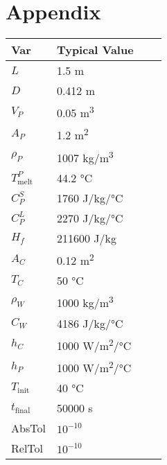 \documentclass[12pt]{article}
\begin{document}
\section{Appendix}
\begin{table}[!h]
\caption{Standard Input Variables} \label{TblInputVar}
\renewcommand{\arraystretch}{1.2}
\noindent \begin{longtable}{l l l c} 
  \toprule
  \textbf{Var} & \textbf{Typical Value}\\
  \midrule 
  $L$	& 1.5 \si[per-mode=symbol]	{\metre}
  \\
  $D$	& 0.412 \si[per-mode=symbol] {\metre}	
  \\
  $V_P$ & 0.05 \si[per-mode=symbol] {\cubic\metre}	
  \\
  $A_P$ & 1.2 \si[per-mode=symbol] {\square\metre}	
  \\
  $\rho_P$ & 1007 \si[per-mode=symbol] {\kilogram\per\cubic\metre}
  \\
  $T_\text{melt}^{P}$ &	44.2 \si[per-mode=symbol] {\celsius} 
  \\
  $C_P^S$ & 1760 \si[per-mode=symbol] {\joule\per\kilo\gram\per\celsius}
  \\
  $C_P^L$ & 2270 \si[per-mode=symbol] {\joule\per\kilo\gram\per\celsius} 
  \\
  $H_f$ & 211600 \si[per-mode=symbol] {\joule\per\kilo\gram} & 
  \\
  $A_C$ & 0.12 \si[per-mode=symbol] {\square\metre}
  \\
  $T_C$	& 50 \si[per-mode=symbol] {\celsius}
  \\
  $\rho_W$ & 1000 \si[per-mode=symbol] {\kilo\gram\per\cubic\metre} 
  \\
  $C_W$ & 4186 \si[per-mode=symbol] {\joule\per\kilo\gram\per\celsius}
  \\
  $h_C$ & 1000 \si[per-mode=symbol] {\watt\per\square\metre\per\celsius}
  \\
  $h_P$ & 1000 \si[per-mode=symbol] {\watt\per\square\metre\per\celsius} 
  \\
  $T_\text{init}$ & 40 \si[per-mode=symbol] {\celsius} 
  \\
  $t_\text{final}$ & 50000 \si[per-mode=symbol] {\second} 
  \\
  AbsTol & $10^{-10}$
  \\
  RelTol & $10^{-10}$
  \\
  \bottomrule
\end{longtable}
\end{table}
\end{document}
